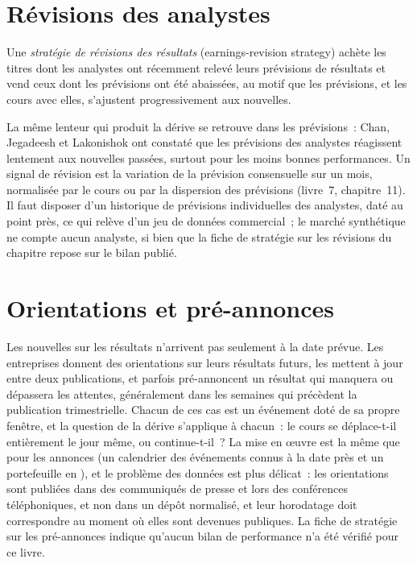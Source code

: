 \section{Révisions des analystes}

\begin{definition}\label{def:s1:earnings:revision}
Une \emph{stratégie de révisions des résultats} (earnings-revision strategy) achète les titres dont les analystes ont récemment relevé leurs prévisions de résultats et vend
ceux dont les prévisions ont été abaissées, au motif que les prévisions, et les cours avec elles, s'ajustent progressivement aux nouvelles.
\end{definition}

La même lenteur qui produit la dérive se retrouve dans les prévisions~: Chan, Jegadeesh et Lakonishok ont constaté que les prévisions des analystes réagissent lentement aux nouvelles passées,
surtout pour les moins bonnes performances. Un signal de révision est la variation de la prévision consensuelle sur un mois, normalisée par le cours ou par la dispersion des
prévisions (livre~7, chapitre~11). Il faut disposer d'un historique de prévisions individuelles des analystes, daté au point près, ce qui relève d'un jeu de données commercial~; le marché synthétique
ne compte aucun analyste, si bien que la fiche de stratégie sur les révisions du chapitre repose sur le bilan publié.

\section{Orientations et pré-annonces}

Les nouvelles sur les résultats n'arrivent pas seulement à la date prévue. Les entreprises donnent des orientations sur leurs résultats futurs, les mettent à jour entre deux publications, et parfois
pré-annoncent un résultat qui manquera ou dépassera les attentes, généralement dans les semaines qui précèdent la publication trimestrielle. Chacun de ces cas est un événement doté de sa propre fenêtre,
et la question de la dérive s'applique à chacun~: le cours se déplace-t-il entièrement le jour même, ou continue-t-il~? La mise en œuvre est la même que pour les annonces (un calendrier
des événements connus à la date près et un portefeuille en ), et le problème des données est plus délicat~: les orientations sont publiées dans des communiqués de presse et lors des conférences téléphoniques, et non dans un
dépôt normalisé, et leur horodatage doit correspondre au moment où elles sont devenues publiques. La fiche de stratégie sur les pré-annonces indique qu'aucun bilan de performance n'a été
vérifié pour ce livre.

